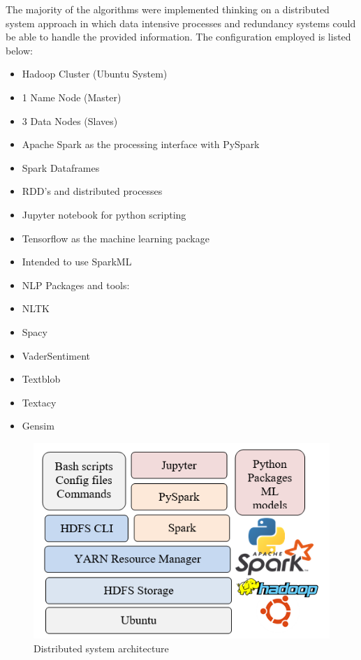 The majority of the algorithms were implemented thinking on a distributed system approach in which data intensive processes and redundancy systems could be able to handle the provided information. The configuration employed is listed below:

\begin{itemize}
    \item Hadoop Cluster (Ubuntu System)
    \item 1 Name Node (Master)
    \item 3 Data Nodes (Slaves)
    \item Apache Spark as the processing interface with PySpark
    \item Spark Dataframes
    \item RDD’s and distributed processes
    \item Jupyter notebook for python scripting
    \item Tensorflow as the machine learning package
    \item Intended to use SparkML
    \item NLP Packages and tools:
    \item NLTK
    \item Spacy
    \item VaderSentiment
    \item Textblob
    \item Textacy
    \item Gensim
\end{itemize}

\begin{figure}[H]
   \centering
   \includegraphics[width=\linewidth]{fig/serverarchitecture.png}
    \caption{Distributed system architecture}
    \label{fig:serverarchitecture}
\end{figure}

